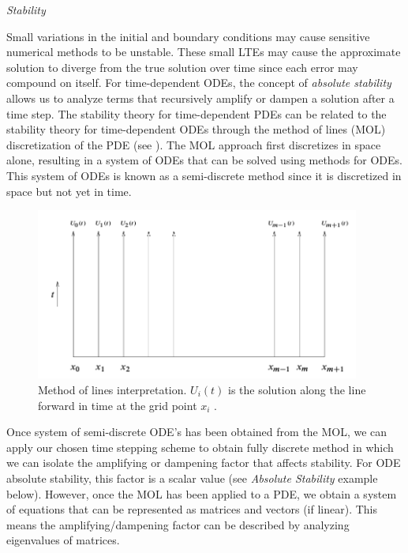 \newpage 



\vspace{0.5cm}
\noindent\textit{Stability}

Small variations in the initial and boundary conditions may cause sensitive numerical methods to be unstable. These small LTEs may cause the approximate solution to diverge from the true solution over time since each error may compound on itself. For time-dependent ODEs, the concept of \textit{absolute stability} allows us to analyze terms that recursively amplify or dampen a solution after a time step. The stability theory for time-dependent PDEs can be related to the stability theory for time-dependent ODEs through the method of lines (MOL) discretization of the PDE (see ). The MOL approach first discretizes in space alone, resulting in a system of ODEs that can be solved using methods for ODEs. This system of ODEs is known as a semi-discrete method since it is discretized in space but not yet in time.

\begin{figure}[htbp] %
    \centering %
    \includegraphics[width=0.95\textwidth]{figures/mol.png} %
    \caption{Method of lines interpretation. $U_i(t)$ is the solution along the line forward in time at the grid point $x_i$ \cite{leveque_fdm}.} 
    \label{fig:mol} %
\end{figure}

Once system of semi-discrete ODE's has been obtained from the MOL, we can apply our chosen time stepping scheme to obtain fully discrete method in which we can isolate the amplifying or dampening factor that affects stability. For ODE absolute stability, this factor is a scalar value (see \textit{Absolute Stability} example below). However, once the MOL has been applied to a PDE, we obtain a system of equations that can be represented as matrices and vectors (if linear). This means the amplifying/dampening factor can be described by analyzing eigenvalues of matrices.


